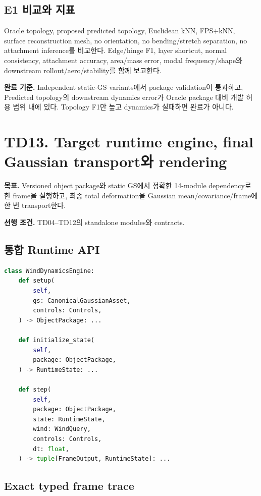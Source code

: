 \documentclass[10pt,a4paper]{article}
\begin{document}
\subsection*{E1 비교와 지표}

Oracle topology, proposed predicted topology, Euclidean kNN, FPS+kNN,
surface reconstruction mesh, no orientation, no bending/stretch separation,
no attachment inference를 비교한다.
Edge/hinge F1, layer shortcut, normal consistency, attachment accuracy, area/mass error,
modal frequency/shape와 downstream rollout/aero/stability를 함께 보고한다.

\textbf{완료 기준.}
Independent static-GS variants에서 package validation이 통과하고,
Predicted topology의 downstream dynamics error가 Oracle package 대비 개발 허용 범위 내에 있다.
Topology F1만 높고 dynamics가 실패하면 완료가 아니다.

\section{TD13. Target runtime engine, final Gaussian transport와 rendering}

\textbf{목표.}
Versioned object package와 static GS에서 정확한 14-module dependency로 한 frame을 실행하고,
최종 total deformation을 Gaussian mean/covariance/frame에 한 번 transport한다.

\textbf{선행 조건.}
TD04--TD12의 standalone modules와 contracts.

\subsection*{통합 Runtime API}

\begin{lstlisting}[language=Python]
class WindDynamicsEngine:
    def setup(
        self,
        gs: CanonicalGaussianAsset,
        controls: Controls,
    ) -> ObjectPackage: ...

    def initialize_state(
        self,
        package: ObjectPackage,
    ) -> RuntimeState: ...

    def step(
        self,
        package: ObjectPackage,
        state: RuntimeState,
        wind: WindQuery,
        controls: Controls,
        dt: float,
    ) -> tuple[FrameOutput, RuntimeState]: ...
\end{lstlisting}

\subsection*{Exact typed frame trace}
\end{document}
